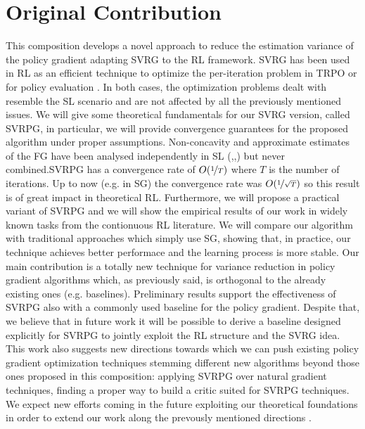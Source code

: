 \section{Original Contribution}
This composition develops a novel approach to reduce the estimation variance of the policy gradient adapting \acs{SVRG} to the \acs{RL} framework.\newline 
\acs{SVRG} has been used in \acs{RL} as an efficient technique to optimize the per-iteration problem in \ac{TRPO} \citep{xu2017stochastic} or for policy evaluation \citep{du2017stochastic}. In both cases, the optimization problems dealt with resemble the \acs{SL} scenario and are not affected by all the previously mentioned issues.
We will give some theoretical fundamentals for our \acs{SVRG} version, called \acs{SVRPG}, in particular, we will provide convergence guarantees for the proposed algorithm under proper assumptions. Non-concavity and approximate estimates of the \acf{FG} have been analysed independently in \acs{SL} (\cite{allen2016variance},\cite{reddi2016stochastic},\cite{harikandeh2015stopwasting}) but never combined.\newline \acf{SVRPG} has a convergence rate of $O(\nicefrac{1}{T})$ where $T$ is the number of iterations. Up to now (e.g. in \acs{SG}) the convergence rate was  $O(\nicefrac{1}{\sqrt{T}})$ so this result is of great impact in theoretical \acs{RL}.\newline
 Furthermore, we will propose a practical variant of \acs{SVRPG} and we will show the empirical results of our work in widely known tasks from the contionuous \acs{RL} literature. We will compare our algorithm with traditional approaches which simply use \acs{SG}, showing that, in practice, our technique achieves better performace and the learning process is more stable.\newline
Our main contribution is a totally new technique for variance reduction in policy gradient algorithms which, as previously said, is orthogonal to the already existing ones (e.g. baselines).
Preliminary results support the effectiveness of \acs{SVRPG} also with a commonly used baseline for the policy gradient. Despite that, we believe that in future work it will be possible to derive a baseline designed explicitly for \acs{SVRPG} to jointly exploit the \acs{RL} structure and the \acs{SVRG} idea.\newline
This work also suggests new directions towards which we can push existing policy gradient optimization techniques stemming different new algorithms beyond those ones proposed in this composition: applying \acs{SVRPG} over natural gradient techniques, finding a proper way to build a critic suited for \acs{SVRPG} techniques. We expect new efforts coming in the future exploiting our theoretical foundations in order to extend our work along the prevously mentioned directions .\newline
